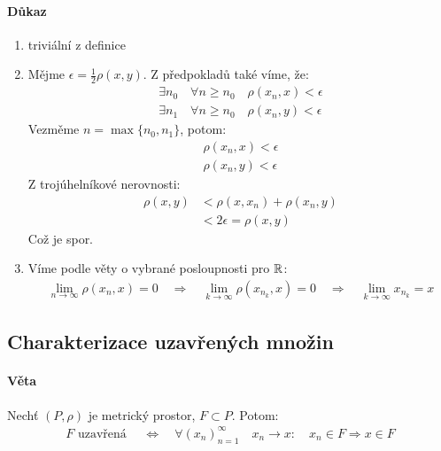 \documentclass[a4paper,10pt]{article}
\begin{document}
\paragraph{Důkaz}
\begin{enumerate}
	\item triviální z definice
	\item Mějme $\epsilon = \frac{1}{2} \rho(x,y)$. Z předpokladů také víme, že:
		\begin{align}
			\exists n_0 \quad \forall n \ge n_0 \quad \rho(x_n, x) < \epsilon\\
			\exists n_1 \quad \forall n \ge n_0 \quad \rho(x_n, y) < \epsilon
		\end{align}
		Vezměme $n = \max\{n_0, n_1 \}$, potom:
		\begin{align}
			\rho(x_n, x) < \epsilon \\
			\rho(x_n, y) < \epsilon 
		\end{align}
		Z trojúhelníkové nerovnosti:
		\begin{align}
			\rho(x,y) &\lt \rho(x,x_n) + \rho(x_n, y) \\
			& < 2 \epsilon = \rho(x,y)
		\end{align}
		Což je spor.
	\item Víme podle věty o vybrané posloupnosti pro $\mathbb{R}$:
		\begin{align}
			\lim_{n\to\infty} \rho(x_n, x) = 0 \quad \Rightarrow \quad
			\lim_{k\to\infty} \rho(x_{n_k}, x) = 0 \quad \Rightarrow \quad
			\lim_{k\to\infty} x_{n_k} = x
		\end{align}
\end{enumerate}

\subsection{Charakterizace uzavřených množin}
\setcounter{equation}{0}
\paragraph{Věta}
Nechť $(P, \rho)$ je metrický prostor, $F \subset P$. Potom:
\begin{align*}
	F \text{ uzavřená }\quad \Leftrightarrow \quad \forall (x_n)_{n=1}^\infty \quad x_n \to x: \quad
	x_n \in F \Rightarrow x \in F
\end{align*}
\end{document}

